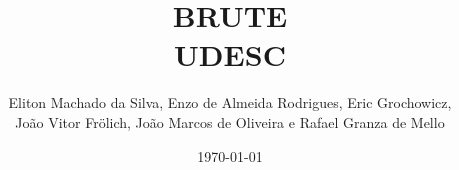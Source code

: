 \documentclass[11pt, a4paper, twoside]{article}
\title{BRUTE \\ UDESC}
\author{Eliton Machado da Silva, Enzo de Almeida Rodrigues, Eric Grochowicz, \\ João Vitor Frölich, João Marcos de Oliveira e Rafael Granza de Mello}
\begin{document}
\date{\today}
\maketitle


\renewcommand{\contentsname}{Índice} %
\tableofcontents
\end{document}
